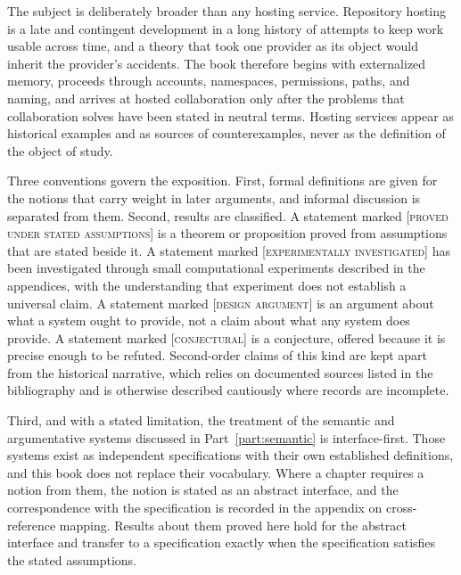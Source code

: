 \documentclass[11pt,twoside,openright]{book}
\theoremstyle{plain}
\theoremstyle{definition}
\theoremstyle{remark}
\newcommand{\Proved}{\textup{\textsc{[proved under stated assumptions]}}}
\newcommand{\Tested}{\textup{\textsc{[experimentally investigated]}}}
\newcommand{\Conj}{\textup{\textsc{[conjectural]}}}
\newcommand{\Design}{\textup{\textsc{[design argument]}}}
\begin{document}
The subject is deliberately broader than any hosting service. Repository hosting is a late and contingent development in a long history of attempts to keep work usable across time, and a theory that took one provider as its object would inherit the provider's accidents. The book therefore begins with externalized memory, proceeds through accounts, namespaces, permissions, paths, and naming, and arrives at hosted collaboration only after the problems that collaboration solves have been stated in neutral terms. Hosting services appear as historical examples and as sources of counterexamples, never as the definition of the object of study.

Three conventions govern the exposition. First, formal definitions are given for the notions that carry weight in later arguments, and informal discussion is separated from them. Second, results are classified. A statement marked \Proved{} is a theorem or proposition proved from assumptions that are stated beside it. A statement marked \Tested{} has been investigated through small computational experiments described in the appendices, with the understanding that experiment does not establish a universal claim. A statement marked \Design{} is an argument about what a system ought to provide, not a claim about what any system does provide. A statement marked \Conj{} is a conjecture, offered because it is precise enough to be refuted. Second-order claims of this kind are kept apart from the historical narrative, which relies on documented sources listed in the bibliography and is otherwise described cautiously where records are incomplete.

Third, and with a stated limitation, the treatment of the semantic and argumentative systems discussed in Part~\ref{part:semantic} is interface-first. Those systems exist as independent specifications with their own established definitions, and this book does not replace their vocabulary. Where a chapter requires a notion from them, the notion is stated as an abstract interface, and the correspondence with the specification is recorded in the appendix on cross-reference mapping. Results about them proved here hold for the abstract interface and transfer to a specification exactly when the specification satisfies the stated assumptions.
\end{document}
